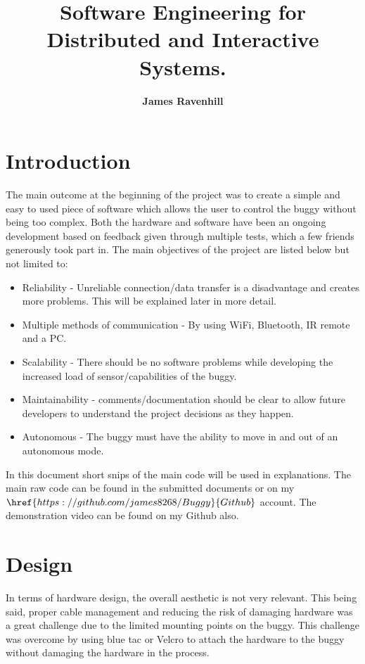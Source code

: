 \documentclass[8pt, a4paper]{article}
\begin{document}
\setlength \topmargin{-1in}
\title{\textbf{Software Engineering for Distributed and Interactive Systems.}}
\author{\textbf{James Ravenhill}}
\date{}
\maketitle

\section{Introduction} 

The main outcome at the beginning of the project was to create a simple and easy to used piece of software which allows the user to control the buggy without being too complex. Both the hardware and software have been an ongoing development based on feedback given through multiple tests, which a few friends generously took part in. The main objectives of the project are listed below but not limited to:

\begin{itemize}
	\item Reliability - Unreliable connection/data transfer is a disadvantage and creates more problems. This will be explained later in more detail.  
	\item  Multiple methods of communication - By using WiFi, Bluetooth, IR remote and a PC. 
	\item Scalability - There should be no software problems while developing the increased load of sensor/capabilities of the buggy. 
	\item Maintainability - comments/documentation should be clear to allow future developers to understand the project decisions as they happen. 
	\item Autonomous - The buggy must have the ability to move in and out of an autonomous mode.  
\end{itemize}

In this document short snips of the main code will be used in explanations. The main raw code can be found in the submitted documents or on my $\href{https://github.com/james8268/Buggy}{Github}$ account. The demonstration video can be found on my Github also. 
 

\section{Design}
In terms of hardware design, the overall aesthetic is not very relevant. This being said, proper cable management and reducing the risk of damaging hardware was a great challenge due to the limited mounting points on the buggy. This challenge was overcome by using blue tac or Velcro to attach the hardware to the buggy without damaging the hardware in the process. 
\end{document}
